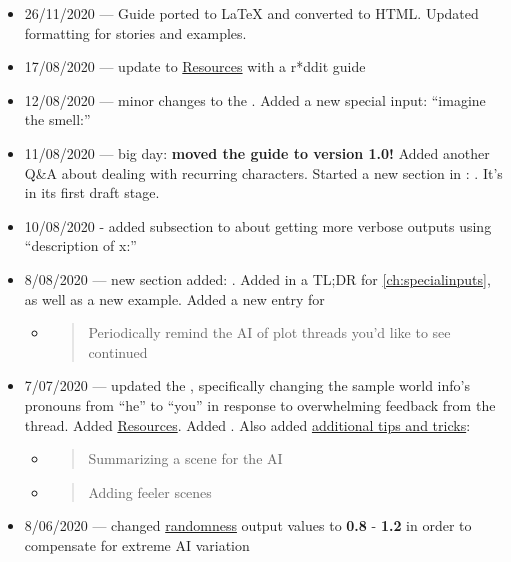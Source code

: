 \documentclass[Avsfag-main.tex]{subfiles}
\begin{document}
\begin{itemize}
\item
  26/11/2020 — Guide ported to LaTeX and converted to HTML. Updated formatting for stories and \wi examples.
\item
  17/08/2020 --- update to \hyperref[ch:resources]{Resources} with a r*ddit guide
\item
  12/08/2020 --- minor changes to the .
  Added a new special input: ``imagine the smell:''
\item
  11/08/2020 --- big day: \textbf{moved the guide to version 1.0!} Added
  another Q\&A about dealing with recurring characters. Started a new
  section in :
  . It's in its first draft stage.
\item
  10/08/2020 - added subsection to  about getting more verbose outputs using ``description of x:''
\item
  8/08/2020 --- new section added: .
  Added in a TL;DR for \cref{ch:specialinputs}, as well as a new example. Added a new entry for

  \begin{itemize}
  \item
    \begin{quote}
    Periodically remind the AI of plot threads you'd like to see
    continued
    \end{quote}
  \end{itemize}
\item
  7/07/2020 --- updated the , specifically changing the sample world info's pronouns
  from ``he'' to ``you'' in response to overwhelming feedback from the
  thread. Added \hyperref[ch:resources]{Resources}. Added . Also
  added \hyperref[sec:tips]{additional tips and tricks}:

  \begin{itemize}
  \item
    \begin{quote}
    Summarizing a scene for the AI
    \end{quote}
  \item
    \begin{quote}
    Adding feeler scenes
    \end{quote}
  \end{itemize}
\item
	8/06/2020 --- changed \hyperref[sec:random]{randomness} output
  values to \textbf{0.8} - \textbf{1.2} in order to compensate for
  extreme AI variation
\end{itemize}
\end{document}
